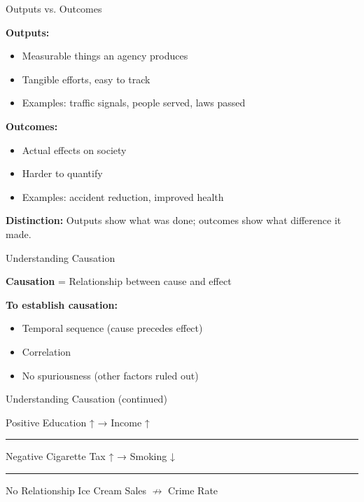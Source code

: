 \documentclass[10pt]{beamer}
\begin{document}
\begin{frame}{Outputs vs. Outcomes}

\begin{block}{}
    \textbf{Outputs:}
    \begin{itemize}
        \item Measurable things an agency produces
        \item Tangible efforts, easy to track
        \item Examples: traffic signals, people served, laws passed
    \end{itemize}

    \textbf{Outcomes:}
    \begin{itemize}
        \item Actual effects on society
        \item Harder to quantify
        \item Examples: accident reduction, improved health
    \end{itemize}

    \vspace{0.4em}
    \textbf{Distinction:} Outputs show what was done; outcomes show what difference it made.
\end{block}

\end{frame}


\begin{frame}{Understanding Causation}

\begin{block}{}
    \textbf{Causation} = Relationship between cause and effect

    \vspace{0.5em}
    \textbf{To establish causation:}
    \begin{itemize}
        \item Temporal sequence (cause precedes effect)
        \item Correlation
        \item No spuriousness (other factors ruled out)
    \end{itemize}
\end{block}

\end{frame}


\begin{frame}{Understanding Causation (continued)}

\begin{block}{Positive}
    Education ↑ → Income ↑
\end{block}

\rule{\textwidth}{0.4pt}

\begin{block}{Negative}
    Cigarette Tax ↑ → Smoking ↓
\end{block}

\rule{\textwidth}{0.4pt}

\begin{block}{No Relationship}
    Ice Cream Sales $\nrightarrow$ Crime Rate
\end{block}

\end{frame}
\end{document}
